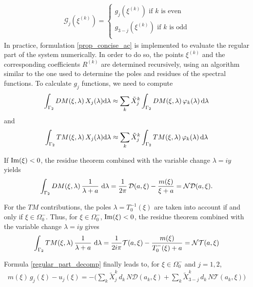 \begin{eqnarray}
\mathcal{G}_j(\xi^{(k)})=
\left\{
\begin{array}{l}
g_j(\xi^{(k)}) \mbox{ if }k \mbox{ is even } \\
g_{3-j}(\xi^{(k)}) \mbox{ if }k \mbox{ is odd}\\
\end{array}
\right.
\end{eqnarray}
In practice, formulation \eqref{prop_concise_ac} is implemented to evaluate the regular part of the system numerically. In order to do so, the points $\xi^{(k)}$  and the corresponding coefficients $R^{(k)}$ are determined recursively, using an algorithm similar to the one used to determine the poles and residues of the spectral functions. To calculate $g_j$ functions, we need to compute
\begin{equation*}
\int_{\Gamma_2} DM(\xi,\lambda) \, X_j(\lambda) {\rm d} \lambda \approx \sum_k \tilde{X}_j^k \int_{\Gamma_2} DM(\xi,\lambda) \, \varphi_k(\lambda) \, {\rm d} \lambda 
\end{equation*}
and
\begin{equation*}
\int_{\Gamma_2} TM(\xi,\lambda) \, X_j(\lambda) {\rm d} \lambda \approx \sum_k \tilde{X}_j^k \int_{\Gamma_2} TM(\xi,\lambda) \, \varphi_k(\lambda) \, {\rm d} \lambda
\end{equation*}

If ${\rm Im}(\xi) < 0$, the residue theorem combined with the variable change $\lambda = iy$  yields
\begin{equation}
\int_{\Gamma_2} DM(\xi,\lambda) \,  \dfrac{1}{\lambda+a} \, \, {\rm d} \lambda =  \dfrac{1}{2\pi} \, \mathcal{D}(a,\xi) - \dfrac{m(\xi)}{\xi +a} = \mathcal{ND}(a,\xi). 
\end{equation}

For the $TM$ contributions, the poles $\lambda = T_0^{-1}(\xi)$ are taken into account if and only if $\xi \in \Omega_0^-$. Thus, for $\xi \in \Omega_0^-$, ${\rm Im}(\xi) < 0$, the residue theorem combined with the variable change $\lambda = iy$ gives
\begin{equation}
\int_{\Gamma_2} TM(\xi,\lambda) \,  \dfrac{1}{\lambda +a} \, \, {\rm d} \lambda = \frac{1}{2i\pi} \mathcal{T}(a,\xi)- \dfrac{m(\xi)}{T_0^-(\xi) +a}   =  \mathcal{NT}(a,\xi)
\end{equation}

Formula \eqref{regular_part_decomp} finally leads to, for $\xi \in \Omega_0^-$ and $j=1,2$,
\begin{eqnarray}
m(\xi)\, g_j(\xi) -  u_j(\xi)=
-\Big( \sum_k \tilde X_j^{k}\, d_k \, N\mathcal D(a_k,\xi)+\sum_k \tilde X_{3-j}^{k} \, d_k \,
N\mathcal T(a_k,\xi) \Big) \nonumber
\end{eqnarray}

